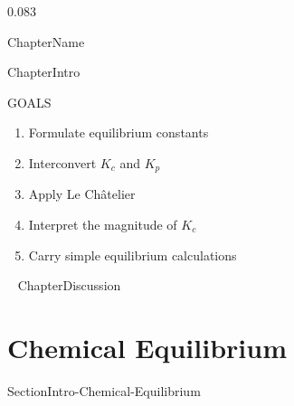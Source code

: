0.083\documentclass[main.tex]{subfiles}
\newcommand\chapterlabel{Ch-equilibrium}\setcounter{figurenewcounter}{0}\setcounter{tablenewcounter}{0}\setcounter{formulanewcounter}{0}
\begin{document}
  
   {ChapterName}


      \begin{marginfigure}
\end{marginfigure}
   {ChapterIntro}




\begin{marginfigure}%
\begin{mytcbox}{GOALS}
\begin{enumerate}[label=\protect\circled{\color{white}\arabic*}]
\item Formulate equilibrium constants
\item Interconvert $K_c$ and $K_p$
\item Apply Le Ch\^{a}telier
\item Interpret the magnitude of $K_c$
\item Carry simple equilibrium calculations
\end{enumerate}
\end{mytcbox}
\vspace{1cm}
\begin{tcolorbox}[enhanced,colback=red!5!white,colframe=black!50!red,boxrule=1pt,
  arc=0pt,outer arc=0pt,drop heavy lifted shadow]
\faGears\ 
  {ChapterDiscussion}


\end{tcolorbox}
\end{marginfigure}%

\section{Chemical Equilibrium} {SectionIntro-Chemical-Equilibrium}
\end{document}

